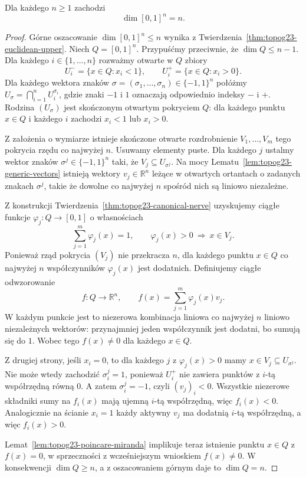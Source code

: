 \begin{twierdzenie}
\label{thm:topog23-cube-dimension}
Dla każdego \(n\ge1\) zachodzi
\[
 \dim[0,1]^n=n.
\]
\end{twierdzenie}
\begin{proof}
Górne oszacowanie \(\dim[0,1]^n\le n\)
wynika z
Twierdzenia~\ref{thm:topog23-euclidean-upper}.
Niech \(Q=[0,1]^n\).
Przypuśćmy przeciwnie, że
\(\dim Q\le n-1\).
Dla każdego \(i\in\{1,\ldots,n\}\)
rozważmy otwarte w \(Q\) zbiory
\[
 U_i^-=\{x\in Q:x_i<1\},\qquad
 U_i^+=\{x\in Q:x_i>0\}.
\]
Dla każdego wektora znaków
\(\sigma=(\sigma_1,\ldots,\sigma_n)
\in\{-1,1\}^n\)
połóżmy
\(U_\sigma=\bigcap_{i=1}^n U_i^{\sigma_i}\),
gdzie znaki \(-1\) i \(1\)
oznaczają odpowiednio indeksy \(-\) i \(+\).
Rodzina \((U_\sigma)\) jest
skończonym otwartym pokryciem \(Q\):
dla każdego punktu \(x\in Q\)
i każdego \(i\) zachodzi
\(x_i<1\) lub \(x_i>0\).

Z założenia o wymiarze istnieje
skończone otwarte rozdrobnienie
\(V_1,\ldots,V_m\) tego pokrycia
rzędu co najwyżej \(n\).
Usuwamy elementy puste.
Dla każdego \(j\)
ustalmy wektor znaków
\(\sigma^j\in\{-1,1\}^n\)
taki, że \(V_j\subseteq U_{\sigma^j}\).
Na mocy Lematu~\ref{lem:topog23-generic-vectors}
istnieją wektory \(v_j\in\mathbb R^n\)
leżące w otwartych ortantach
o zadanych znakach \(\sigma^j\),
takie że dowolne co najwyżej \(n\)
spośród nich są liniowo niezależne.

Z konstrukcji
Twierdzenia~\ref{thm:topog23-canonical-nerve}
uzyskujemy ciągłe funkcje
\(\varphi_j\colon Q\to[0,1]\)
o własnościach
\[
 \sum_{j=1}^{m}\varphi_j(x)=1,\qquad
 \varphi_j(x)>0\ \Longrightarrow\ x\in V_j.
\]
Ponieważ rząd pokrycia \((V_j)\)
nie przekracza \(n\),
dla każdego punktu \(x\in Q\)
co najwyżej \(n\) współczynników
\(\varphi_j(x)\) jest dodatnich.
Definiujemy ciągłe odwzorowanie
\[
 f\colon Q\longrightarrow\mathbb R^n,
 \qquad
 f(x)=\sum_{j=1}^{m}\varphi_j(x)v_j.
\]
W każdym punkcie jest to niezerowa
kombinacja liniowa co najwyżej \(n\)
liniowo niezależnych wektorów:
przynajmniej jeden współczynnik jest dodatni,
bo sumują się do \(1\).
Wobec tego \(f(x)\neq0\)
dla każdego \(x\in Q\).

Z drugiej strony, jeśli \(x_i=0\),
to dla każdego \(j\) z \(\varphi_j(x)>0\)
mamy \(x\in V_j\subseteq U_{\sigma^j}\).
Nie może wtedy zachodzić
\(\sigma_i^j=1\), ponieważ
\(U_i^+\) nie zawiera punktów
z \(i\)-tą współrzędną równą \(0\).
A zatem \(\sigma_i^j=-1\),
czyli \((v_j)_i<0\).
Wszystkie niezerowe składniki
sumy na \(f_i(x)\) mają ujemną
\(i\)-tą współrzędną,
więc \(f_i(x)<0\).
Analogicznie na ścianie \(x_i=1\)
każdy aktywny \(v_j\)
ma dodatnią \(i\)-tą współrzędną,
a więc \(f_i(x)>0\).

Lemat~\ref{lem:topog23-poincare-miranda}
implikuje teraz istnienie punktu
\(x\in Q\) z \(f(x)=0\),
w sprzeczności z wcześniejszym
wnioskiem \(f(x)\neq0\).
W konsekwencji \(\dim Q\ge n\),
a z oszacowaniem górnym daje to
\(\dim Q=n\).
\end{proof}

